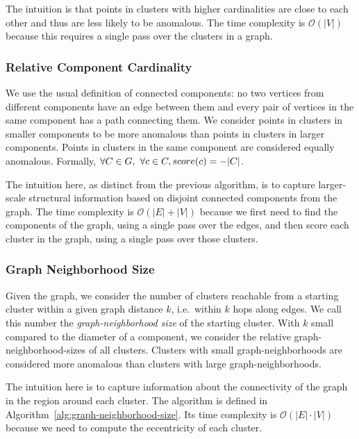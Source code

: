 The intuition is that points in clusters with higher cardinalities are close to each other and thus are less likely to be anomalous.
The time complexity is $\mathcal{O}(|V|)$ because this requires a single pass over the clusters in a graph.


\subsubsection{Relative Component Cardinality}
\label{subsubsec:methods:individual-algorithms:relative-component-cardinality}
We use the usual definition of connected components:
no two vertices from different components have an edge between them and every pair of vertices in the same component has a path connecting them.
We consider points in clusters in smaller components to be more anomalous than points in clusters in larger components.
Points in clusters in the same component are considered equally anomalous.
Formally, $\forall C \in G, \ \forall c \in C,  \\score(c) = -|C|$.

The intuition here, as distinct from the previous algorithm, is to capture larger-scale structural information based on disjoint connected components from the graph.
The time complexity is $\mathcal{O}(|E| + |V|)$ because we first need to find the components of the graph, using a single pass over the edges, and then score each cluster in the graph, using a single pass over those clusters.


\subsubsection{Graph Neighborhood Size}
\label{subsubsec:methods:individual-algorithms:graph-neighborhood-size}
Given the graph, we consider the number of clusters reachable from a starting cluster within a given graph distance $k$, i.e.\ within $k$ hops along edges.
We call this number the \textit{graph-neighborhood size} of the starting cluster.
With $k$ small compared to the diameter of a component, we consider the relative graph-neighborhood-sizes of all clusters.
Clusters with small graph-neighborhoods are considered more anomalous than clusters with large graph-neighborhoods.

The intuition here is to capture information about the connectivity of the graph in the region around each cluster.
The algorithm is defined in Algorithm~\ref{alg:graph-neighborhood-size}.
Its time complexity is $\mathcal{O}(|E| \cdot |V|)$ because we need to compute the eccentricity of each cluster.

